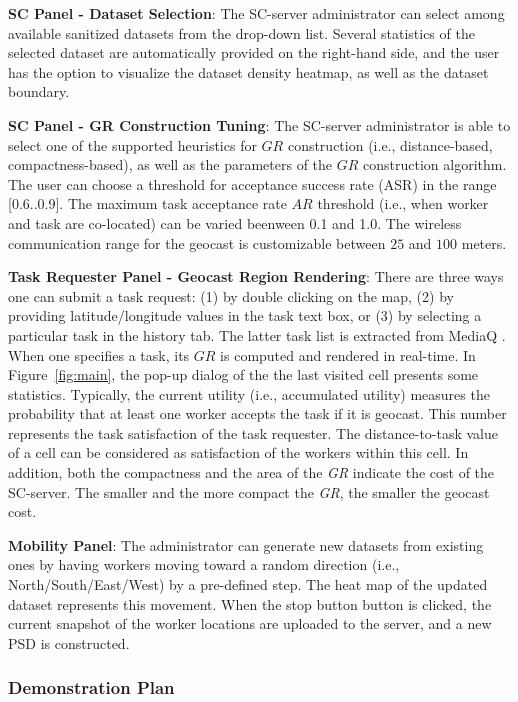 \documentclass{USC-Thesis}
\numberwithin{equation}{chapter}
\begin{document}
\textbf{SC Panel - Dataset Selection}: The SC-server administrator can select among available sanitized datasets from the drop-down list. Several statistics of the selected dataset are automatically provided on the right-hand side, and the user has the option to visualize the dataset density heatmap, as well as the dataset boundary.

\textbf{SC Panel - GR Construction Tuning}: The SC-server administrator is able to select one of the supported heuristics for $GR$ construction (i.e., distance-based, compactness-based), as well as the parameters of the $\mathit{GR}$ construction algorithm.
The user can choose a threshold for acceptance success rate (ASR) in the range [0.6..0.9]. The maximum task acceptance rate $\mathit{AR}$ threshold (i.e., when worker and task are co-located) can be varied beenween 0.1 and 1.0. The wireless communication range for the geocast is customizable between $25$ and $100$ meters.

\textbf{Task Requester Panel - Geocast Region Rendering}: There are three ways one can submit a task request: (1) by double clicking on the map, (2) by providing latitude/longitude values in the task text box, or (3) by selecting a particular task in the history tab. The latter task list is extracted from MediaQ \cite{kim2014mediaq}. When one specifies a task, its $\mathit{GR}$ is computed and rendered in real-time. In Figure~\ref{fig:main}, the pop-up dialog of the the last visited cell presents some statistics. Typically, the current utility (i.e., accumulated utility) measures the probability that at least one worker accepts the task if it is geocast. This number represents the task satisfaction of the task requester. The distance-to-task value of a cell can be considered as satisfaction of the workers within this cell. In addition, both the compactness and the area of the {\em GR} indicate the cost of the SC-server. The smaller and the more compact the {\em GR}, the smaller the geocast cost.

\textbf{Mobility Panel}: The administrator can generate new datasets from existing ones by having workers moving toward a random direction (i.e., North/South/East/West) by a pre-defined step. The heat map of the updated dataset represents this movement. When the stop button button is clicked, the current snapshot of the worker locations are uploaded to the server, and a new PSD is constructed.

\subsubsection{Demonstration Plan}
\label{sec:scenario}
\end{document}
